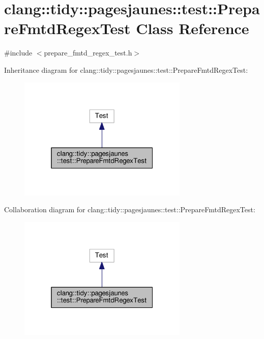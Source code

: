 \hypertarget{classclang_1_1tidy_1_1pagesjaunes_1_1test_1_1_prepare_fmtd_regex_test}{}\section{clang\+:\+:tidy\+:\+:pagesjaunes\+:\+:test\+:\+:Prepare\+Fmtd\+Regex\+Test Class Reference}
\label{classclang_1_1tidy_1_1pagesjaunes_1_1test_1_1_prepare_fmtd_regex_test}


{\ttfamily \#include $<$prepare\+\_\+fmtd\+\_\+regex\+\_\+test.\+h$>$}



Inheritance diagram for clang\+:\+:tidy\+:\+:pagesjaunes\+:\+:test\+:\+:Prepare\+Fmtd\+Regex\+Test\+:
\nopagebreak
\begin{figure}[H]
\begin{center}
\leavevmode
\includegraphics[width=229pt]{classclang_1_1tidy_1_1pagesjaunes_1_1test_1_1_prepare_fmtd_regex_test__inherit__graph}
\end{center}
\end{figure}


Collaboration diagram for clang\+:\+:tidy\+:\+:pagesjaunes\+:\+:test\+:\+:Prepare\+Fmtd\+Regex\+Test\+:
\nopagebreak
\begin{figure}[H]
\begin{center}
\leavevmode
\includegraphics[width=229pt]{classclang_1_1tidy_1_1pagesjaunes_1_1test_1_1_prepare_fmtd_regex_test__coll__graph}
\end{center}
\end{figure}
